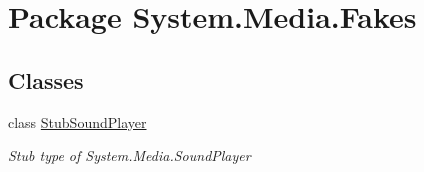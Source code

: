 \hypertarget{namespace_system_1_1_media_1_1_fakes}{\section{Package System.\-Media.\-Fakes}
\label{namespace_system_1_1_media_1_1_fakes}
}
\subsection*{Classes}
\begin{DoxyCompactItemize}
\item 
class \hyperlink{class_system_1_1_media_1_1_fakes_1_1_stub_sound_player}{Stub\-Sound\-Player}
\begin{DoxyCompactList}\small\item\em Stub type of System.\-Media.\-Sound\-Player\end{DoxyCompactList}\end{DoxyCompactItemize}

